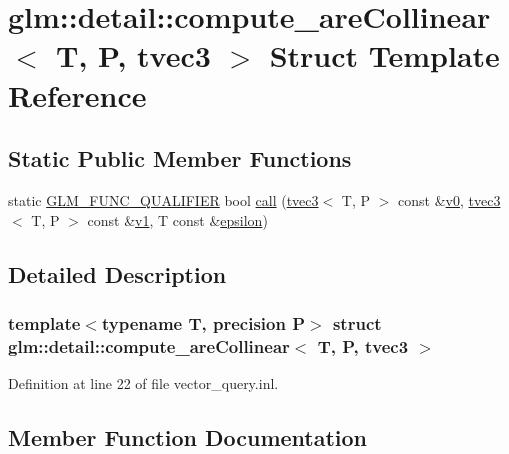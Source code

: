 \hypertarget{structglm_1_1detail_1_1compute__are_collinear_3_01_t_00_01_p_00_01tvec3_01_4}{}\section{glm\+::detail\+::compute\+\_\+are\+Collinear$<$ T, P, tvec3 $>$ Struct Template Reference}
\label{structglm_1_1detail_1_1compute__are_collinear_3_01_t_00_01_p_00_01tvec3_01_4}
\subsection*{Static Public Member Functions}
\begin{DoxyCompactItemize}
\item 
static \mbox{\hyperlink{setup_8hpp_a33fdea6f91c5f834105f7415e2a64407}{G\+L\+M\+\_\+\+F\+U\+N\+C\+\_\+\+Q\+U\+A\+L\+I\+F\+I\+ER}} bool \mbox{\hyperlink{structglm_1_1detail_1_1compute__are_collinear_3_01_t_00_01_p_00_01tvec3_01_4_a4a9fce4b46bc6906c0b6b44c31accdb1}{call}} (\mbox{\hyperlink{structglm_1_1tvec3}{tvec3}}$<$ T, P $>$ const \&\mbox{\hyperlink{glad_8h_a7062a23d1d434121d4a88f530703d06a}{v0}}, \mbox{\hyperlink{structglm_1_1tvec3}{tvec3}}$<$ T, P $>$ const \&\mbox{\hyperlink{glad_8h_a0779c3b73f9aa3a0ac5b0139b5d291d9}{v1}}, T const \&\mbox{\hyperlink{group__gtc__constants_ga2a1e57fc5592b69cfae84174cbfc9429}{epsilon}})
\end{DoxyCompactItemize}


\subsection{Detailed Description}
\subsubsection*{template$<$typename T, precision P$>$\newline
struct glm\+::detail\+::compute\+\_\+are\+Collinear$<$ T, P, tvec3 $>$}



Definition at line 22 of file vector\+\_\+query.\+inl.



\subsection{Member Function Documentation}
\mbox{\label{structglm_1_1detail_1_1compute__are_collinear_3_01_t_00_01_p_00_01tvec3_01_4_a4a9fce4b46bc6906c0b6b44c31accdb1}} 
